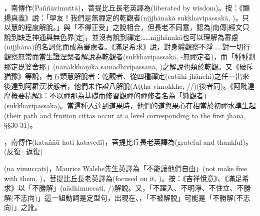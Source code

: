 \startitemgroup[noteitems]
\item{}，南傳作(Paññāvimuttā)，菩提比丘長老英譯為(liberated by wisdom)。按：《顯揚真義》說：「學友！我們是無禪定的乾觀者(nijjhānakā sukkhavipassakā, )，只以慧的程度解脫。」與「不得正受」之說相合，但長老不同意，認為[南傳]經文只說到缺乏神通與無色界[定]，並沒有說到禪定……nijjhānakā也可以理解為審慮(nijjhāna)的名詞化而成為審慮者。《滿足希求》說，對身體觀察不淨……對一切行觀察無常而當生證涅槃者解說為乾觀者(sukkhavipassakā, -無禪定者)，而「種種剎那定毘婆舍那」(nānākkhaṇikā samādhivipassanā, )之解說也類於乾觀。又《破斥猶豫》等說，有五類慧解脫者：乾觀者、從四種禪定(catūhi jhānehi)之任一出來後達到阿羅漢狀態者，他們未作證八解脫(Aṭṭha vimokkhe, //)(後者同)。《阿毗達摩概要精解》：不以禪那為基礎而修習觀禪的禪修者名為「純觀者」(sukkhavipassaka)。當這種人達到道果時，他們的道與果心在相當於初禪水準生起(their path and fruition cittas occur at a level corresponding to the first jhāna, §§30-31)。
\stopitemgroup

\startitemgroup[noteitems]
\item{}，南傳作(kataññū hoti katavedī)，菩提比丘長老英譯為(grateful and thankful)。(反復=返復)
\stopitemgroup

\startitemgroup[noteitems]
\item{}(na vimuccati)，Maurice Walshe先生英譯為「不能讓他們自由」(not make free with them, )，菩提比丘長老英譯為(focused on it, )。按：《吉祥悅意》、《滿足希求》以「不勝解」(nādhimuccati, /)解說。又，「不躍入、不明淨、不住立、不勝解(不志向)」這一組動詞是定型句，出現在、，「不被解脫」可能是「不勝解(不志向)」之訛。
\stopitemgroup

